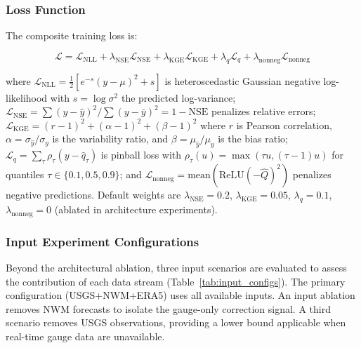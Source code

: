 \documentclass[draft]{agujournal2019}
\begin{document}
\subsubsection*{Loss Function}
The composite training loss is:
\begin{linenomath*}
\begin{equation}
\mathcal{L} = \mathcal{L}_{\text{NLL}} + \lambda_{\text{NSE}} \mathcal{L}_{\text{NSE}} + \lambda_{\text{KGE}} \mathcal{L}_{\text{KGE}} + \lambda_q \mathcal{L}_q + \lambda_{\text{nonneg}} \mathcal{L}_{\text{nonneg}}
\end{equation}
\end{linenomath*}
where $\mathcal{L}_{\text{NLL}} = \frac{1}{2}\left[e^{-s}(y - \mu)^2 + s\right]$ is heteroscedastic Gaussian negative log-likelihood with $s = \log\sigma^2$ the predicted log-variance; $\mathcal{L}_{\text{NSE}} = \sum(y - \hat{y})^2 / \sum(y - \bar{y})^2 = 1 - \text{NSE}$ penalizes relative errors; $\mathcal{L}_{\text{KGE}} = (r-1)^2 + (\alpha-1)^2 + (\beta-1)^2$ where $r$ is Pearson correlation, $\alpha = \sigma_{\hat{y}}/\sigma_y$ is the variability ratio, and $\beta = \mu_{\hat{y}}/\mu_y$ is the bias ratio; $\mathcal{L}_q = \sum_{\tau} \rho_\tau(y - \hat{q}_\tau)$ is pinball loss with $\rho_\tau(u) = \max(\tau u, (\tau-1)u)$ for quantiles $\tau \in \{0.1, 0.5, 0.9\}$; and $\mathcal{L}_{\text{nonneg}} = \text{mean}(\text{ReLU}(-\hat{Q})^2)$ penalizes negative predictions. Default weights are $\lambda_{\text{NSE}} = 0.2$, $\lambda_{\text{KGE}} = 0.05$, $\lambda_q = 0.1$, $\lambda_{\text{nonneg}} = 0$ (ablated in architecture experiments).

\subsubsection*{Input Experiment Configurations}
Beyond the architectural ablation, three input scenarios are evaluated to assess the contribution of each data stream (Table~\ref{tab:input_configs}). The primary configuration (USGS+NWM+ERA5) uses all available inputs. An input ablation removes NWM forecasts to isolate the gauge-only correction signal. A third scenario removes USGS observations, providing a lower bound applicable when real-time gauge data are unavailable.
\end{document}
